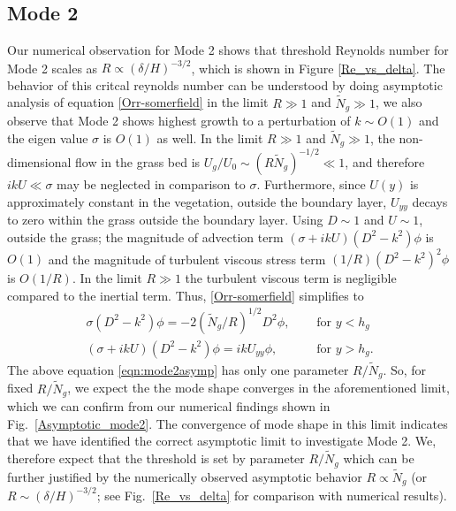 \documentclass[12pt]{report}   %
\newcommand{\hg}{h_g}
\newcommand{\Rey}{{R}}
\newcommand{\Ndg}{\tilde{N}_g}
\begin{document}
\subsection{Mode 2}
Our numerical observation for Mode 2 shows that threshold Reynolds number for Mode 2 scales as $\Rey \propto ({\delta}/{H})^{-3/2}$, which is shown in Figure \ref{Re_vs_delta}. The behavior of this critcal reynolds number can be understood by doing asymptotic analysis of equation \ref{Orr-somerfield} in the limit $\Rey \gg 1$ and $\Ndg \gg 1$, we also observe that Mode 2 shows highest growth to a perturbation of $k \sim O(1)$ and the eigen value $\sigma$ is $O(1)$ as well. In the limit $\Rey \gg 1$ and $\Ndg \gg 1$, the non-dimensional flow in the grass bed is $U_g/U_0 \sim (\Rey \Ndg)^{-1/2} \ll 1$, and therefore $ikU \ll \sigma$ may be neglected in comparison to $\sigma$. Furthermore, since $U(y)$ is approximately constant in the vegetation, outside the boundary layer, $U_{yy}$ decays to zero within the grass outside the boundary layer. Using $D\sim 1$ and $U \sim 1$, outside the grass; the magnitude of advection term $\left(\sigma + i k U\right)\left(D^2- k^2\right) \phi$ is $O(1)$ and the magnitude of turbulent viscous stress term $(1/\Rey)\left(D^2-k^2\right)^2\phi$ is $O(1/R)$. In the limit $\Rey \gg 1$ the turbulent viscous term is negligible compared to the inertial term.
Thus, \eqref{Orr-somerfield} simplifies to 
\begin{subequations}
\begin{align}
\sigma\left(D^2-k^2\right)\phi = -2{(\Ndg/\Rey)^{1/2}}D^2\phi,  \quad &\text{ for } y<\hg  \label{eqn:mode2asympa} \\
\left(\sigma+ikU\right) \left(D^2-k^2\right)\phi =  ikU_{yy}\phi, \quad &\text{ for } y>\hg. \label{eqn:mode2asympb}
\end{align}
\label{eqn:mode2asymp}
\end{subequations}
The above equation \eqref{eqn:mode2asymp} has only one parameter $\Rey/\Ndg$. 
So, for fixed $\Rey/\Ndg$, we expect the the mode shape converges in the aforementioned limit, which we can confirm from our numerical findings shown in Fig.~\ref{Asymptotic_mode2}. The convergence of mode shape in this limit indicates that we have identified the correct asymptotic limit to investigate Mode 2. We, therefore expect that the  threshold is set by parameter $\Rey/\Ndg$ which can be further justified by the numerically observed asymptotic behavior $\Rey \propto \Ndg$ (or $\Rey \sim ({\delta}/{H})^{-3/2}$; see Fig.~\ref{Re_vs_delta} for comparison with numerical results).
\end{document}
